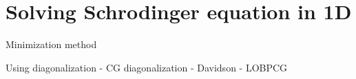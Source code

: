 \chapter{Solving Schrodinger equation in 1D}

Minimization method

Using diagonalization
- CG diagonalization
- Davidson
- LOBPCG
